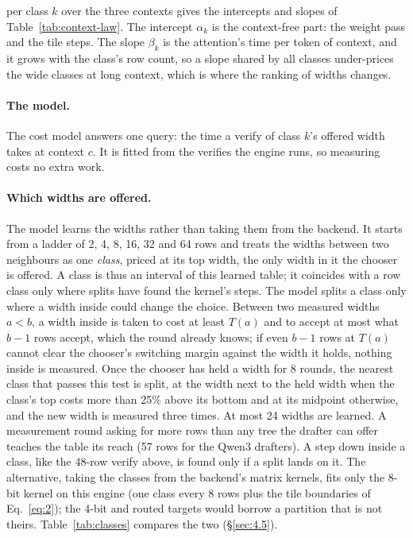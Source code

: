 \documentclass[10pt,twocolumn,letterpaper]{article}
\begin{document}
per class $k$ over the three contexts gives the intercepts and slopes of Table~\ref{tab:context-law}. The intercept $\alpha_{k}$ is the context-free part: the weight pass and the tile steps. The slope $\beta_{k}$ is the attention's time per token of context, and it grows with the class's row count, so a slope shared by all classes under-prices the wide classes at long context, which is where the ranking of widths changes.



\paragraph{The model.} The cost model answers one query: the time a verify of class $k$'s offered width takes at context $c$. It is fitted from the verifies the engine runs, so measuring costs no extra work.

\paragraph{Which widths are offered.} The model learns the widths rather than taking them from the backend. It starts from a ladder of 2, 4, 8, 16, 32 and 64 rows and treats the widths between two neighbours as one \emph{class}, priced at its top width, the only width in it the chooser is offered. A class is thus an interval of this learned table; it coincides with a row class only where splits have found the kernel's steps. The model splits a class only where a width inside could change the choice. Between two measured widths $a < b$, a width inside is taken to cost at least $T(a)$ and to accept at most what $b - 1$ rows accept, which the round already knows; if even $b - 1$ rows at $T(a)$ cannot clear the chooser's switching margin against the width it holds, nothing inside is measured. Once the chooser has held a width for 8 rounds, the nearest class that passes this test is split, at the width next to the held width when the class's top costs more than 25\% above its bottom and at its midpoint otherwise, and the new width is measured three times. At most 24 widths are learned. A measurement round asking for more rows than any tree the drafter can offer teaches the table its reach (57 rows for the Qwen3 drafters). A step down inside a class, like the 48-row verify above, is found only if a split lands on it. The alternative, taking the classes from the backend's matrix kernels, fits only the 8-bit kernel on this engine (one class every 8 rows plus the tile boundaries of Eq.~\eqref{eq:2}); the 4-bit and routed targets would borrow a partition that is not theirs. Table~\ref{tab:classes} compares the two (\S\ref{sec:4.5}).
\end{document}
